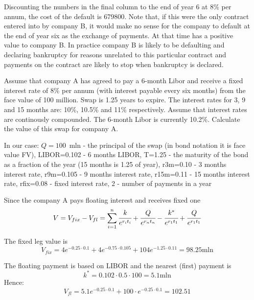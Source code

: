\documentclass[12pt,a4paper]{exam}
\begin{document}
\begin{questions}
\begin{solution}
Discounting the numbers in the final column to the end of year 6 at 8\% per annum, the cost of the default is 679800. Note that, if this were the only contract entered into by company B, it would make no sense for the company to default at the end of year six as the exchange of payments. At that time has a positive value to company B.
In practice company B is likely to be defaulting and declaring bankruptcy for reasons unrelated to this particular contract and payments on the contract are likely to stop when bankruptcy is declared.
\end{solution}

\question Assume that company A has agreed to pay a 6-month Libor and receive a fixed interest rate of 8\% per annum (with interest payable every six months) from the face value of 100 million. Swap is 1.25 years to expire. The interest rates for 3, 9 and 15 months are: 10\%, 10.5\% and 11\% respectively. Assume that interest rates are continously compounded. The 6-month Libor is currently 10.2\%. Calculate the value of this swap for company A.

\begin{solution}
In our case: $Q= 100$~mln - the principal of the swap (in bond notation it is face value FV), LIBOR=0.102 - 6 months LIBOR, T=1.25 - the maturity of the bond as a fraction of the year (15 months is 1.25 of year), r3m=0.10 - 3 months interest rate, r9m=0.105 - 9 months interest rate, r15m=0.11 - 15 months interest rate, rfix=0.08 - fixed interest rate, 2 - number of payments in a year

Since the company A pays floating interest and receives fixed one
\begin{equation*}
V=V_{fix}-V_{fl} = \sum_{i=1}^n \cfrac{k}{e^{r_i t_i}} + \cfrac{Q}{e^{r_n t_n}} - \cfrac{k^*}{e^{r_1 t_1}}+\cfrac{Q}{e^{r_1 t_1}}
\end{equation*}

The fixed leg value is
\begin{equation*}
V_{fix} = 4e^{-0.25\cdot 0.1} +  4e^{-0.75\cdot 0.105} +  104e^{-1.25\cdot 0.11} = 98.25\text{mln}
\end{equation*}

The floating payment is based on LIBOR and the nearest (first) payment is 
\begin{equation*}
k^*=0.102\cdot0.5\cdot 100 = 5.1\text{mln}
\end{equation*}
Hence:
\begin{equation*}
V_{fl}=5.1e^{-0.25\cdot 0.1}+100\cdot e^{-0.25\cdot 0.1} = 102.51
\end{equation*}


\end{solution}
\end{questions}
\end{document}

